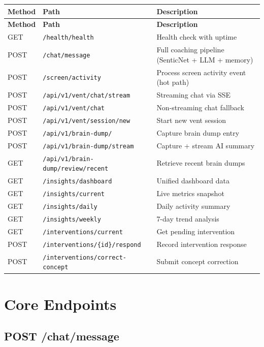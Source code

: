 \begin{longtable}{@{}llp{6.5cm}@{}}
  \toprule
  \textbf{Method} & \textbf{Path} & \textbf{Description} \\
  \midrule
  \endfirsthead
  \toprule
  \textbf{Method} & \textbf{Path} & \textbf{Description} \\
  \midrule
  \endhead
  \bottomrule
  \endfoot
  GET  & \texttt{/health/health} & Health check with uptime \\
  POST & \texttt{/chat/message} & Full coaching pipeline (SenticNet + LLM + memory) \\
  POST & \texttt{/screen/activity} & Process screen activity event (hot path) \\
  POST & \texttt{/api/v1/vent/chat/stream} & Streaming chat via SSE \\
  POST & \texttt{/api/v1/vent/chat} & Non-streaming chat fallback \\
  POST & \texttt{/api/v1/vent/session/new} & Start new vent session \\
  POST & \texttt{/api/v1/brain-dump/} & Capture brain dump entry \\
  POST & \texttt{/api/v1/brain-dump/stream} & Capture + stream AI summary \\
  GET  & \texttt{/api/v1/brain-dump/review/recent} & Retrieve recent brain dumps \\
  GET  & \texttt{/insights/dashboard} & Unified dashboard data \\
  GET  & \texttt{/insights/current} & Live metrics snapshot \\
  GET  & \texttt{/insights/daily} & Daily activity summary \\
  GET  & \texttt{/insights/weekly} & 7-day trend analysis \\
  GET  & \texttt{/interventions/current} & Get pending intervention \\
  POST & \texttt{/interventions/\{id\}/respond} & Record intervention response \\
  POST & \texttt{/interventions/correct-concept} & Submit concept correction \\
\end{longtable}

\section{Core Endpoints}

\subsection{POST /chat/message}

